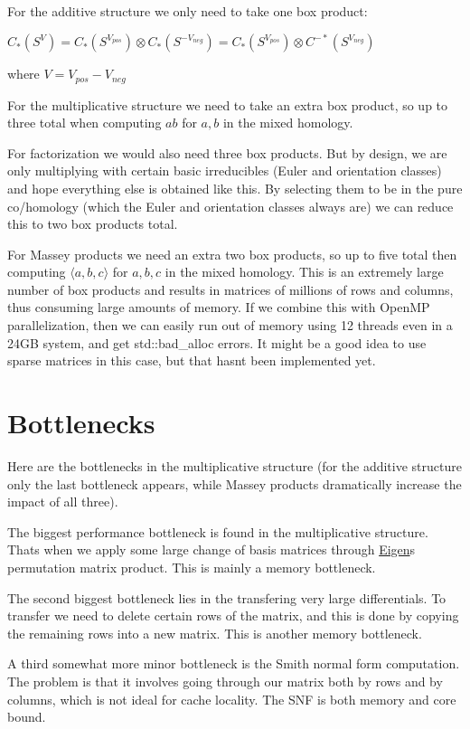 \begin{DoxyItemize}
\item For the additive structure we only need to take one box product\+:

$C_*(S^V)=C_*(S^{V_{pos}})\otimes C_*(S^{-V_{neg}})=C_*(S^{V_{pos}})\otimes C^{-*}(S^{V_{neg}})$
\end{DoxyItemize}

where $V=V_{pos}-V_{neg}$


\begin{DoxyItemize}
\item For the multiplicative structure we need to take an extra box product, so up to three total when computing $ab$ for $a,b$ in the mixed homology.
\item For factorization we would also need three box products. But by design, we are only multiplying with certain basic irreducibles (Euler and orientation classes) and hope everything else is obtained like this. By selecting them to be in the pure co/homology (which the Euler and orientation classes always are) we can reduce this to two box products total.
\item For Massey products we need an extra two box products, so up to five total then computing $\langle a,b,c\rangle $ for $a,b,c$ in the mixed homology. This is an extremely large number of box products and results in matrices of millions of rows and columns, thus consuming large amounts of memory. If we combine this with Open\+MP parallelization, then we can easily run out of memory using 12 threads even in a 24\+GB system, and get {\ttfamily std\+::bad\+\_\+alloc} errors. It might be a good idea to use sparse matrices in this case, but that hasn\textquotesingle{}t been implemented yet.
\end{DoxyItemize}\hypertarget{perf_bottle}{}\section{Bottlenecks}\label{perf_bottle}
Here are the bottlenecks in the multiplicative structure (for the additive structure only the last bottleneck appears, while Massey products dramatically increase the impact of all three).


\begin{DoxyItemize}
\item The biggest performance bottleneck is found in the multiplicative structure. That\textquotesingle{}s when we apply some large change of basis matrices through \hyperlink{namespaceEigen}{Eigen}\textquotesingle{}s permutation matrix product. This is mainly a memory bottleneck.
\item The second biggest bottleneck lies in the transfering very large differentials. To transfer we need to delete certain rows of the matrix, and this is done by copying the remaining rows into a new matrix. This is another memory bottleneck.
\item A third somewhat more minor bottleneck is the Smith normal form computation. The problem is that it involves going through our matrix both by rows and by columns, which is not ideal for cache locality. The S\+NF is both memory and core bound. 
\end{DoxyItemize}